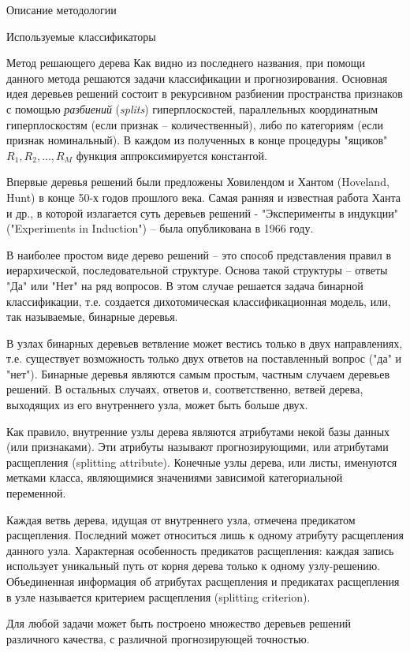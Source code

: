 \begin{section}{Описание методологии}
\begin{subsection}{Используемые классификаторы}
\begin{subsubsection}{Метод решающего дерева}
Как видно из последнего названия, при помощи данного метода решаются задачи классификации и прогнозирования.
Основная идея деревьев решений состоит в рекурсивном разбиении пространства признаков с помощью \textit{разбиений} (\textit{splits}) гиперплоскостей, параллельных координатным гиперплоскостям (если признак – количественный), либо по категориям (если признак номинальный). В каждом из полученных в конце процедуры "ящиков" $R_1,R_2,…,R_M$ функция аппроксимируется константой.

Впервые деревья решений были предложены Ховилендом и Хантом (Hoveland, Hunt) в конце 50-х годов прошлого века. Самая ранняя и известная работа Ханта и др., в которой излагается суть деревьев решений - "Эксперименты в индукции" ("Experiments in Induction") – была опубликована в 1966 году.

В наиболее простом виде дерево решений – это способ представления правил в иерархической, последовательной структуре. Основа такой структуры – ответы "Да" или "Нет" на ряд вопросов. В этом случае решается задача бинарной классификации, т.е. создается дихотомическая классификационная модель, или, так называемые, бинарные деревья.

В узлах бинарных деревьев ветвление может вестись только в двух направлениях, т.е. существует возможность только двух ответов на поставленный вопрос ("да" и "нет"). Бинарные деревья являются самым простым, частным случаем деревьев решений. В остальных случаях, ответов и, соответственно, ветвей дерева, выходящих из его внутреннего узла, может быть больше двух.

Как правило, внутренние узлы дерева являются атрибутами некой базы данных (или признаками). Эти атрибуты называют прогнозирующими, или атрибутами расщепления (splitting attribute). Конечные узлы дерева, или листы, именуются метками класса, являющимися значениями зависимой категориальной переменной.

Каждая ветвь дерева, идущая от внутреннего узла, отмечена предикатом расщепления. Последний может относиться лишь к одному атрибуту расщепления данного узла. Характерная особенность предикатов расщепления: каждая запись использует уникальный путь от корня дерева только к одному узлу-решению. Объединенная информация об атрибутах расщепления и предикатах расщепления в узле называется критерием расщепления (splitting criterion).

Для любой задачи может быть построено множество деревьев решений различного качества, с различной прогнозирующей точностью.


\end{subsubsection}
\end{subsection}
\end{section}
